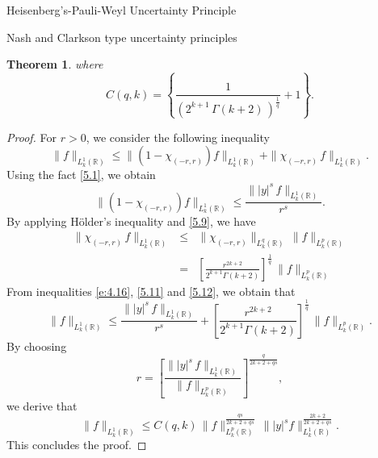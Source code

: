 \documentclass[12pt,a4paper,reqno]{amsproc}
\newtheorem{theorem}{Theorem}[section]
\theoremstyle{definition}
\theoremstyle{remark}
\numberwithin{equation}{section}
\begin{document}
\begin{subsection}{Heisenberg's-Pauli-Weyl Uncertainty Principle}
\begin{subsection}{Nash and Clarkson type uncertainty principles}
\begin{theorem}
where
\begin{equation*}
    C(q,k) = \left\{ \frac{1}{(2^{k+1}
    \,\Gamma(k+2)\,)^{\frac{1}{q}}}+ 1\right\}.
\end{equation*} 
\end{theorem}
\begin{proof}
     For  $r>0$, we consider the following inequality
\begin{equation}\label{e:4.16}
 \|f\|_{L^1_k(\mathbb{R})} \le   \|\left(1-\chi_{(-r,r)}\right)f\|_{L_k^1(\mathbb{R})}+  \|\chi_{(-r,r)}\,f\|_{L^1_k(\mathbb{R})}.
 \end{equation}
 Using the fact \eqref{5.1}, we obtain
\begin{equation} \label{5.11}
 \|\left(1-\chi_{(-r,r)}\right)f\|_{L_k^1(\mathbb{R})}\le \frac{\||y|^s\,f\|_{L^1_k(\mathbb{R})}}{r^s}.  
\end{equation}
By applying H{\"o}lder's inequality and  \eqref{5.9}, we have
\begin{eqnarray} \label{5.12}
 \nonumber\|\chi_{(-r,r)}\,f\|_{L^1_k(\mathbb{R})}&\le& \|\chi_{(-r,r)}\|_{L_k^q(\mathbb{R})}\, \|f\|_{L_k^p(\mathbb{R})}\\
&=& \left[\frac{r^{2k+2}}{2^{k+1}\Gamma(k+2)}\right]^{\frac{1}{q}}\, \|f\|_{L_k^p(\mathbb{R})}
\end{eqnarray}
From inequalities \eqref{e:4.16}, \eqref{5.11} and \eqref{5.12}, we obtain that
\begin{equation*}
 \|f\|_{L^1_k(\mathbb{R})} \le  \frac{\||y|^s\,f\|_{L^1_k(\mathbb{R})}}{r^s}+\left[\frac{r^{2k+2}}{2^{k+1}\Gamma(k+2)}\right]^{\frac{1}{q}}\, \|f\|_{L_k^p(\mathbb{R})}.   
\end{equation*}
By choosing \begin{equation*}
 r= \left[\frac{\||y|^s\,f\|_{L^1_k(\mathbb{R})} }{\|f\|_{L_k^p(\mathbb{R})}} \right]^{\frac{q}{2k+2+qs}},  
\end{equation*}
we derive that
\begin{equation*}
    \|f\|_{L^1_k(\mathbb{R})}  \le C(q,k)\,\|f\|_{L_k^p(\mathbb{R})}^{\frac{qs}{2k+2+qs}}\, \||y|^sf\|_{L^1_k(\mathbb{R})}^{\frac{2k+2}{2k+2+qs}}. 
\end{equation*}
This concludes the proof.


\end{proof}
\end{subsection}
\end{subsection}
\end{document}
